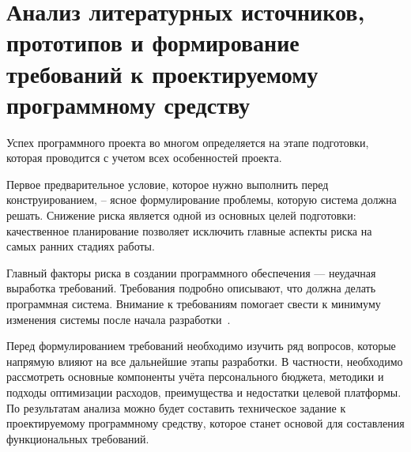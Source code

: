 \section{Анализ литературных источников, прототипов и формирование требований к проектируемому программному средству}
\label{sec:analysis}

Успех программного проекта во многом определяется на этапе подготовки, которая проводится с учетом всех особенностей проекта.

Первое предварительное условие, которое нужно выполнить перед конструированием, -- ясное формулирование проблемы, которую система должна решать.
Снижение риска является одной из основных целей подготовки: качественное планирование позволяет исключить главные аспекты риска на самых ранних стадиях работы.

Главный факторы риска в создании программного обеспечения — неудачная выработка требований.
Требования подробно описывают, что должна делать программная система.
Внимание к требованиям помогает свести к минимуму изменения системы после начала разработки~\cite{code_complete}.

Перед формулированием требований необходимо изучить ряд вопросов, которые напрямую влияют на все дальнейшие этапы разработки.
В частности, необходимо рассмотреть основные компоненты учёта персонального бюджета, методики и подходы оптимизации расходов, преимущества и недостатки целевой платформы.
По результатам анализа можно будет составить техническое задание к проектируемому программному средству, которое станет основой для составления функциональных требований.






